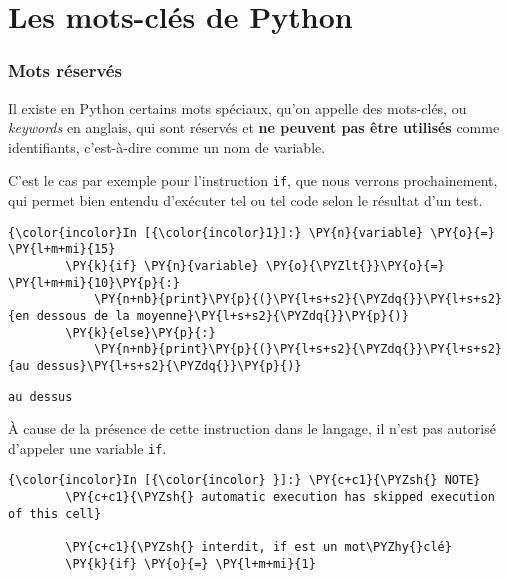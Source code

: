     
    
    
    

    

    \hypertarget{les-mots-cluxe9s-de-python}{%
\section{Les mots-clés de Python}\label{les-mots-cluxe9s-de-python}}

    \hypertarget{mots-ruxe9servuxe9s}{%
\subsubsection{Mots réservés}\label{mots-ruxe9servuxe9s}}

    Il existe en Python certains mots spéciaux, qu'on appelle des mots-clés,
ou \emph{keywords} en anglais, qui sont réservés et \textbf{ne peuvent
pas être utilisés} comme identifiants, c'est-à-dire comme un nom de
variable.

    C'est le cas par exemple pour l'instruction \texttt{if}, que nous
verrons prochainement, qui permet bien entendu d'exécuter tel ou tel
code selon le résultat d'un test.

    \begin{Verbatim}[commandchars=\\\{\}]
{\color{incolor}In [{\color{incolor}1}]:} \PY{n}{variable} \PY{o}{=} \PY{l+m+mi}{15}
        \PY{k}{if} \PY{n}{variable} \PY{o}{\PYZlt{}}\PY{o}{=} \PY{l+m+mi}{10}\PY{p}{:}
            \PY{n+nb}{print}\PY{p}{(}\PY{l+s+s2}{\PYZdq{}}\PY{l+s+s2}{en dessous de la moyenne}\PY{l+s+s2}{\PYZdq{}}\PY{p}{)}
        \PY{k}{else}\PY{p}{:}
            \PY{n+nb}{print}\PY{p}{(}\PY{l+s+s2}{\PYZdq{}}\PY{l+s+s2}{au dessus}\PY{l+s+s2}{\PYZdq{}}\PY{p}{)}
\end{Verbatim}


    \begin{Verbatim}[commandchars=\\\{\}]
au dessus

    \end{Verbatim}

    À cause de la présence de cette instruction dans le langage, il n'est
pas autorisé d'appeler une variable \texttt{if}.

    \begin{Verbatim}[commandchars=\\\{\}]
{\color{incolor}In [{\color{incolor} }]:} \PY{c+c1}{\PYZsh{} NOTE}
        \PY{c+c1}{\PYZsh{} automatic execution has skipped execution of this cell}
        
        \PY{c+c1}{\PYZsh{} interdit, if est un mot\PYZhy{}clé}
        \PY{k}{if} \PY{o}{=} \PY{l+m+mi}{1}
\end{Verbatim}


